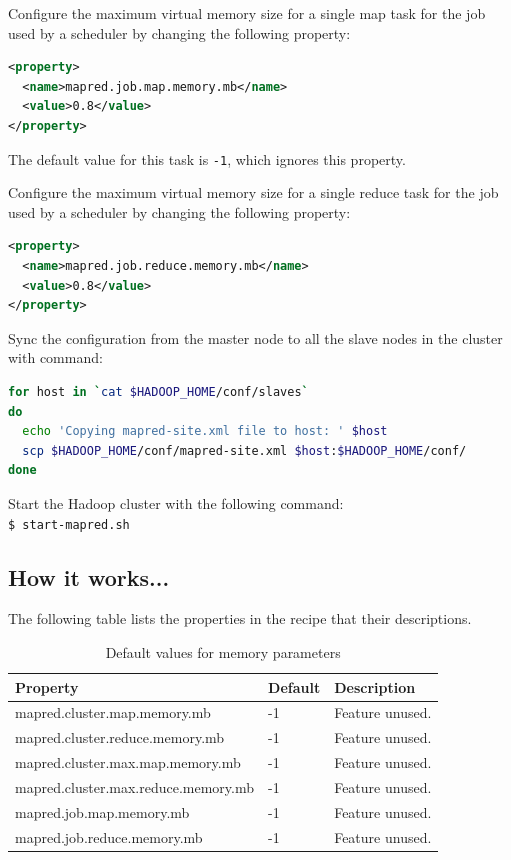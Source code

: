 Configure the maximum virtual memory size for a single map task for the job used by a scheduler by changing the following property:
\lstset{style=bashstyle}
\begin{lstlisting}[language=XML]
<property>
  <name>mapred.job.map.memory.mb</name>
  <value>0.8</value>
</property>
\end{lstlisting}

The default value for this task is \verb|-1|, which ignores this property.

Configure the maximum virtual memory size for a single reduce task for the job used by a scheduler by changing the following property:
\lstset{style=bashstyle}
\begin{lstlisting}[language=XML]
<property>
  <name>mapred.job.reduce.memory.mb</name>
  <value>0.8</value>
</property>
\end{lstlisting}

Sync the configuration from the master node to all the slave nodes in the cluster with command:
\lstset{style=bashstyle}
\begin{lstlisting}[language=bash]
for host in `cat $HADOOP_HOME/conf/slaves`
do
  echo 'Copying mapred-site.xml file to host: ' $host
  scp $HADOOP_HOME/conf/mapred-site.xml $host:$HADOOP_HOME/conf/
done
\end{lstlisting}

Start the Hadoop cluster with the following command: \\
\verb|$ start-mapred.sh|

\subsection*{How it works...}
The following table lists the properties in the recipe that their descriptions.
\begin{table}[ht]
  \centering
  \begin{tabular}{lll}
    \toprule
    \textbf{Property} &  \textbf{Default} &  \textbf{Description} \\ \midrule
      mapred.cluster.map.memory.mb & -1 & Feature unused. \\
      mapred.cluster.reduce.memory.mb & -1 & Feature unused. \\
      mapred.cluster.max.map.memory.mb & -1 & Feature unused. \\
      mapred.cluster.max.reduce.memory.mb & -1 & Feature unused. \\
      mapred.job.map.memory.mb & -1 & Feature unused. \\
      mapred.job.reduce.memory.mb & -1 & Feature unused. \\ \bottomrule
  \end{tabular}
  \caption{Default values for memory parameters}\label{tbl:memoryconfig.default}
\end{table}


